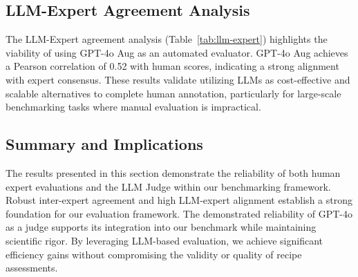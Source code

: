 \subsection{LLM-Expert Agreement Analysis}



The LLM-Expert agreement analysis (Table~\ref{tab:llm-expert}) highlights the viability of using GPT-4o Aug as an automated evaluator. GPT-4o Aug achieves a Pearson correlation of 0.52 with human scores, indicating a strong alignment with expert consensus. 
These results validate utilizing LLMs as cost-effective and scalable alternatives to complete human annotation, particularly for large-scale benchmarking tasks where manual evaluation is impractical.  

\subsection{Summary and Implications}  
\label{subsec:summary_implications}  

The results presented in this section demonstrate the reliability of both human expert evaluations and the LLM Judge within our benchmarking framework. Robust inter-expert agreement and high LLM-expert alignment establish a strong foundation for our evaluation framework. The demonstrated reliability of GPT-4o as a judge supports its integration into our benchmark while maintaining scientific rigor. By leveraging LLM-based evaluation, we achieve significant efficiency gains without compromising the validity or quality of recipe assessments.
